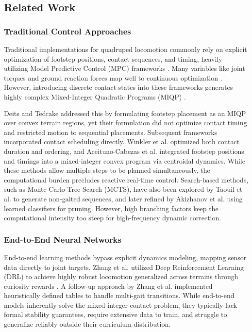 \subsection{Related Work}

\subsubsection{Traditional Control Approaches}
Traditional implementations for quadruped locomotion commonly rely on explicit
optimization of footstep positions, contact sequences, and timing,
heavily utilizing
Model Predictive Control (MPC) frameworks
\cite{Kim2019highly-dynamic}. Many variables
like joint torques and ground reaction forces map well to continuous
optimization \cite{Wensing2022Nov}.
However, introducing discrete contact states into these frameworks
generates highly complex Mixed-Integer Quadratic Programs (MIQP)
\cite{Geisert2019contact-planning}.

Deits and Tedrake \cite{deits_footstep_2014} addressed this by
formulating footstep
placement as an MIQP over convex terrain regions, yet their
formulation did not optimize
contact timing and restricted motion to sequential placements.
Subsequent frameworks
incorporated contact scheduling directly. Winkler et al.
\cite{winkler_gait_2018}
optimized both contact duration and ordering, and Aceituno-Cabezas et
al. \cite{aceituno_simultaneous_2019}
integrated footstep positions and timings into a mixed-integer convex
program via
centroidal dynamics. While these methods allow multiple steps to be planned
simultaneously, the computational burden precludes reactive real-time control.
Search-based methods, such as Monte Carlo Tree Search (MCTS), have also been
explored by Taouil et al. \cite{taouil_non-gaited_2024} to generate non-gaited
sequences, and later refined by Akizhanov et al. \cite{akizhanov_learning_2024}
using learned classifiers for pruning. However, high branching factors keep
the computational intensity too steep for high-frequency dynamic correction.

\subsubsection{End-to-End Neural Networks}
End-to-end learning methods bypass explicit dynamics modeling,
mapping sensor data
directly to joint targets. Zhang et al. \cite{zhang_learning_2023} utilized Deep
Reinforcement Learning (DRL) to achieve highly robust locomotion
generalized across
terrains through curiosity rewards \cite{Gurram2024survey}. A
follow-up approach by
Zhang et al. \cite{zhang_novel_2024} implemented heuristically
defined tables to handle
multi-gait transitions. While end-to-end models inherently solve the
mixed-integer
contact problem, they typically lack formal stability guarantees,
require extensive
data to train, and struggle to generalize reliably outside their
curriculum distribution.

